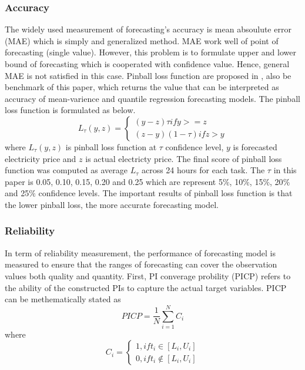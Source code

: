 \documentclass[review]{elsarticle}
\begin{document}
      \subsubsection{Accuracy}
        The widely used measurement of forecasting's accuracy is mean absoulute error (MAE) which is simply and generalized method. MAE work well of point of forecasting (single value). However, this problem is to formulate upper and lower bound of forecasting which is cooperated with confidence value. Hence, general MAE is not satisfied in this case.
        Pinball loss function are proposed in \cite{Maciejowska2016}, also be benchmark of this paper, which returns the value that can be interpreted as accuracy of mean-varience and quantile regression forecasting models. The pinball loss function is formulated as below.
        \begin{equation}
          L_{\tau}(y,z) =
          \begin{cases}
            (y-z)\tau if y>=z \\
            (z-y)(1-\tau) if z>y
          \end{cases}
          \label{eq.pinball}
        \end{equation}
        where $L_{\tau}(y,z)$ is pinball loss function at $\tau$ confidence level, $y$ is forecasted electricity price and $z$ is actual electricty price. The final score of pinball loss function was computed as average $L_{\tau}$ across 24 hours for each task. The $\tau$ in this paper is 0.05, 0.10, 0.15, 0.20 and 0.25 which are represent 5$\%$, 10$\%$, 15$\%$, 20$\%$ and 25$\%$ confidence levels.
        The important results of pinball loss function is that the lower pinball loss, the more accurate forecasting model.

      \subsubsection{Reliability}
        In term of reliability measurement, the performance of forecasting model is measured to ensure that the ranges of forecasting can cover the observation values both quality and quantity.
        First,  PI converage probility (PICP) refers to the ability of the constructed PIs to capture the actual target variables. PICP can be methematically stated as
        \begin{equation}
          PICP = \frac{1}{N} \sum_{i=1}^{N} C_{i}
          \label{eq.PICP}
        \end{equation}
        where
        \begin{equation}
          C_{i} =
          \begin{cases}
            1, if t_{i} \in [L_{i},U_{i}] \\
            0, if t_{i} \not\in [L_{i},U_{i}]
          \end{cases}
          \label{eq.Ci}
        \end{equation}
\end{document}
